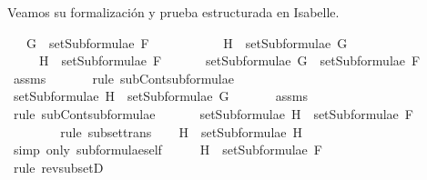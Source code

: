 \begin{isabellebody}
\begin{isamarkuptext}
  Veamos su formalización y prueba estructurada en Isabelle.%
\end{isamarkuptext}\isamarkuptrue%
\isamarkupfalse%
\isanewline
\ \ \ {\isachardoublequoteopen}G\ {\isasymin}\ setSubformulae\ F{\isachardoublequoteclose}\ \isanewline
\ \ \ \ \ \ \ \ \ \ {\isachardoublequoteopen}H\ {\isasymin}\ setSubformulae\ G{\isachardoublequoteclose}\isanewline
\ \ \ \ \ {\isachardoublequoteopen}H\ {\isasymin}\ setSubformulae\ F{\isachardoublequoteclose}\isanewline
%
\isadelimproof
%
\endisadelimproof
%
\isatagproof
{}\isamarkupfalse%
\ {\isacharminus}\isanewline
\ \ \isamarkupfalse%
\ {}{\isacharcolon}\ {\isachardoublequoteopen}setSubformulae\ G\ {\isasymsubseteq}\ setSubformulae\ F{\isachardoublequoteclose}\ \isanewline
\ \ \ \ \isamarkupfalse%
\ assms{\isacharparenleft}{}{\isacharparenright}\ \isanewline
\ \ \ \ \isamarkupfalse%
\ {\isacharparenleft}rule\ subContsubformulae{\isacharparenright}\isanewline
\ \ \isamarkupfalse%
\ {\isachardoublequoteopen}setSubformulae\ H\ {\isasymsubseteq}\ setSubformulae\ G{\isachardoublequoteclose}\ \isanewline
\ \ \ \ \isamarkupfalse%
\ assms{\isacharparenleft}{}{\isacharparenright}\ \isanewline
\ \ \ \ \isamarkupfalse%
\ {\isacharparenleft}rule\ subContsubformulae{\isacharparenright}\isanewline
\ \ \isamarkupfalse%
\ \isamarkupfalse%
\ {}{\isacharcolon}\ {\isachardoublequoteopen}setSubformulae\ H\ {\isasymsubseteq}\ setSubformulae\ F{\isachardoublequoteclose}\ \isanewline
\ \ \ \ \isamarkupfalse%
\ {}\ \isanewline
\ \ \ \ \isamarkupfalse%
\ {\isacharparenleft}rule\ subset{\isacharunderscore}trans{\isacharparenright}\isanewline
\ \ \isamarkupfalse%
\ {\isachardoublequoteopen}H\ {\isasymin}\ setSubformulae\ H{\isachardoublequoteclose}\ \isanewline
\ \ \ \ \isamarkupfalse%
\ {\isacharparenleft}simp\ only{\isacharcolon}\ subformulae{\isacharunderscore}self{\isacharparenright}\isanewline
\ \ \isamarkupfalse%
\ \isamarkupfalse%
\ {\isachardoublequoteopen}H\ {\isasymin}\ setSubformulae\ F{\isachardoublequoteclose}\ \isanewline
\ \ \ \ \isamarkupfalse%
\ {}\ \isanewline
\ \ \ \ \isamarkupfalse%
\ {\isacharparenleft}rule\ rev{\isacharunderscore}subsetD{\isacharparenright}\isanewline
{}\isamarkupfalse%

\end{isabellebody}
